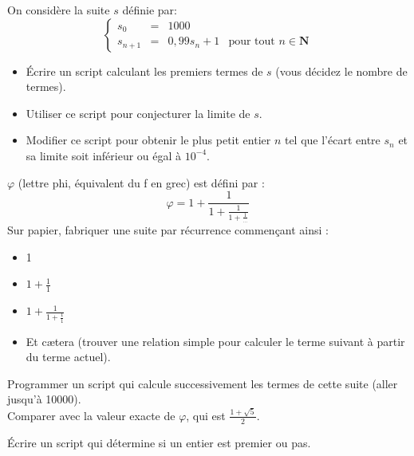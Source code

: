 \begin{exercice}
    On considère la suite $s$ définie par:
    \tabulardefault
    $$\left\{
    \begin{array}{llll}
    s_0 & = & 1000 & \\
    s_{n+1} & = & 0,99s_n+1 & \textrm{pour tout } n\in\mathbf{N}
    \end{array}
    \right. $$
    
    \begin{itemize}
        \item   \'Ecrire un script calculant les premiers termes de $s$ (vous décidez le nombre de termes).
        \item   Utiliser ce script pour conjecturer la limite de $s$.
        \item   Modifier ce script pour obtenir le plus petit entier $n$ tel que l'écart entre $s_n$ et sa limite soit inférieur ou égal à $10^{-4}$.
        
    \end{itemize}
\end{exercice}

\begin{exercice}
    $\varphi$ (lettre phi, équivalent du \og f \fg{} en grec) est défini par : $$\varphi=1+\frac{1}{1+\frac{1}{1+\frac{1}{\ldots}}}$$
    Sur papier, fabriquer une suite par récurrence commençant ainsi :
    \begin{itemize}
        \item   1
        \item   $1+\frac{1}{1}$
        \item   $1+\frac{1}{1+\frac{1}{1}}$
        \item   Et c\ae tera (trouver une relation simple pour calculer le terme suivant à partir du terme actuel).
    \end{itemize}
    Programmer un script qui calcule successivement les termes de cette suite (aller jusqu'à 10000\eme).\\
    
    Comparer avec la valeur exacte de $\varphi$, qui est $\frac{1+\sqrt{5}}{2}$.
\end{exercice}

\begin{exercice}
    \'Ecrire un script qui détermine si un entier est premier ou pas.
\end{exercice}